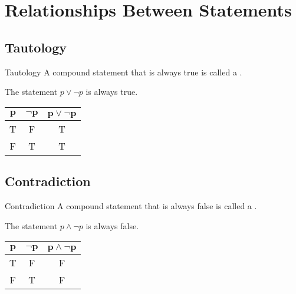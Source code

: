 \documentclass[../notes.tex]{subfiles}
\begin{document}
		\section{Relationships Between Statements}
			\subsection{Tautology}
				\begin{definition}{Tautology}
					A compound statement that is always true is called a .
				\end{definition}
				\begin{example}
					The statement $p \lor \lnot p$ is always true.
					\begin{center}
						\begin{tabular}{| c c | c |}
							\hline
							$\mathbf{p}$ & $\mathbf{\lnot p}$ & $\mathbf{p \lor \lnot p}$\\
							\hline
							T & F & T\\
							F & T & T\\
							\hline
						\end{tabular}
					\end{center}
				\end{example}
			\subsection{Contradiction}
				\begin{definition}{Contradiction}
					A compound statement that is always false is called a .
				\end{definition}
				\begin{example}
					The statement $p \land \lnot p$ is always false.
					\begin{center}
						\begin{tabular}{| c c | c |}
							\hline
							$\mathbf{p}$ & $\mathbf{\lnot p}$ & $\mathbf{p \land \lnot p}$\\
							\hline
							T & F & F\\
							F & T & F\\
							\hline
						\end{tabular}
					\end{center}
				\end{example}
\end{document}
